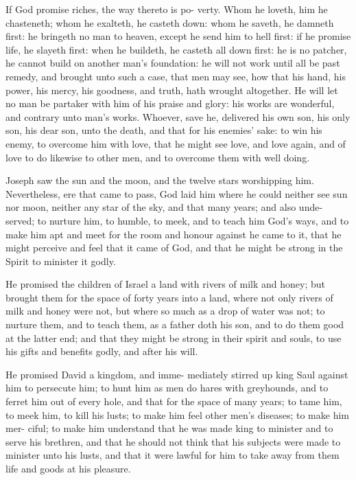 \documentclass{custom}
\begin{document}
If God promise riches, the way thereto is po- 
verty. Whom he loveth, him he chasteneth;
whom he exalteth, he casteth down: whom he 
saveth, he damneth first: he bringeth no man to 
heaven, except he send him to hell first: if he 
promise life, he slayeth first: when he buildeth,
he casteth all down first: he is no patcher, 
he cannot build on another man's foundation:
he will not work until all be past remedy, and 
brought unto such a case, that men may see, how 
that his hand, his power, his mercy, his goodness, 
and truth, hath wrought altogether. He will let no 
man be partaker with him of his praise and glory:
his works are wonderful, and contrary unto man's 
works. Whoever, save he, delivered his own 
son, his only son, his dear son, unto the death, 
and that for his enemies' sake: to win his enemy, 
to overcome him with love, that he might see 
love, and love again, and of love to do likewise to 
other men, and to overcome them with well doing. 



Joseph saw the sun and the moon, and the 
twelve stars worshipping him. Nevertheless, 
ere that came to pass, God laid him where he 
could neither see sun nor moon, neither any star 
of the sky, and that many years; and also unde- 
served; to nurture him, to humble, to meek, and
to teach him God's ways, and to make him apt 
and meet for the room and honour against he 
came to it, that he might perceive and feel that 
it came of God, and that he might be strong in 
the Spirit to minister it godly. 

He promised the children of Israel a land 
with rivers of milk and honey; but brought them 
for the space of forty years into a land, where 
not only rivers of milk and honey were not, but 
where so much as a drop of water was not; to 
nurture them, and to teach them, as a father 
doth his son, and to do them good at the latter 
end; and that they might be strong in their 
spirit and souls, to use his gifts and benefits 
godly, and after his will.

He promised David a kingdom, and imme- 
mediately stirred up king Saul against him to 
persecute him; to hunt him as men do hares 
with greyhounds, and to ferret him out of every 
hole, and that for the space of many years; to 
tame him, to meek him, to kill his lusts; to make 
him feel other men's diseases; to make him mer- 
ciful; to make him understand that he was made 
king to minister and to serve his brethren, and 
that he should not think that his subjects were 
made to minister unto his lusts, and that it were 
lawful for him to take away from them life and 
goods at his pleasure.
\end{document}
